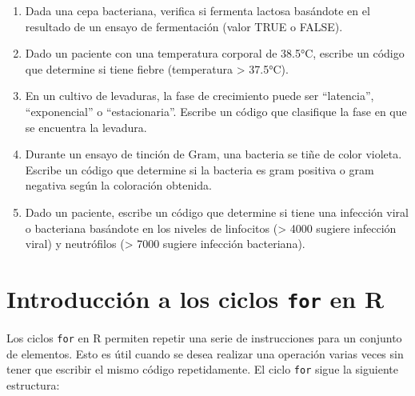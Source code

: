 \documentclass[
]{book}
\begin{document}
\begin{enumerate}
\item
  Dada una cepa bacteriana, verifica si fermenta lactosa basándote en el resultado de un ensayo de fermentación (valor TRUE o FALSE).
\item
  Dado un paciente con una temperatura corporal de 38.5°C, escribe un código que determine si tiene fiebre (temperatura \textgreater{} 37.5°C).
\item
  En un cultivo de levaduras, la fase de crecimiento puede ser ``latencia'', ``exponencial'' o ``estacionaria''. Escribe un código que clasifique la fase en que se encuentra la levadura.
\item
  Durante un ensayo de tinción de Gram, una bacteria se tiñe de color violeta. Escribe un código que determine si la bacteria es gram positiva o gram negativa según la coloración obtenida.
\item
  Dado un paciente, escribe un código que determine si tiene una infección viral o bacteriana basándote en los niveles de linfocitos (\textgreater{} 4000 sugiere infección viral) y neutrófilos (\textgreater{} 7000 sugiere infección bacteriana).
\end{enumerate}

\chapter{\texorpdfstring{Introducción a los ciclos \texttt{for} en R}{Introducción a los ciclos for en R}}\label{introducciuxf3n-a-los-ciclos-for-en-r}

Los ciclos \texttt{for} en R permiten repetir una serie de instrucciones para un conjunto de elementos. Esto es útil cuando se desea realizar una operación varias veces sin tener que escribir el mismo código repetidamente. El ciclo \texttt{for} sigue la siguiente estructura:
\end{document}
